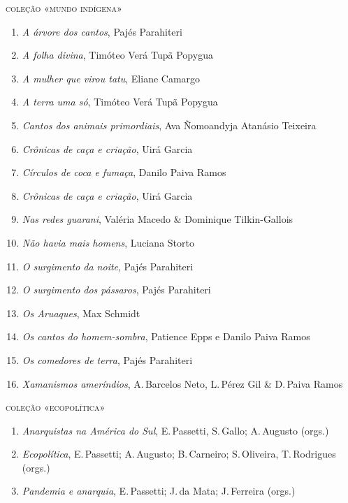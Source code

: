 \medskip
{\large\textsc{coleção «mundo indígena»}}

\begin{enumerate}
\setlength\parskip{4.2pt}
\setlength\itemsep{-1.4mm}
\item \textit{A árvore dos cantos}, Pajés Parahiteri
\item \textit{A folha divina}, Timóteo Verá Tupã Popygua
\item \textit{A mulher que virou tatu}, Eliane Camargo
\item \textit{A terra uma só}, Timóteo Verá Tupã Popygua
\item \textit{Cantos dos animais primordiais}, Ava Ñomoandyja Atanásio Teixeira
\item \textit{Crônicas de caça e criação}, Uirá Garcia
\item \textit{Círculos de coca e fumaça}, Danilo Paiva Ramos
\item \textit{Crônicas de caça e criação}, Uirá Garcia
\item \textit{Nas redes guarani}, Valéria Macedo \& Dominique Tilkin-Gallois
\item \textit{Não havia mais homens}, Luciana Storto
\item \textit{O surgimento da noite}, Pajés Parahiteri
\item \textit{O surgimento dos pássaros}, Pajés Parahiteri
\item \textit{Os Aruaques}, Max Schmidt
\item \textit{Os cantos do homem-sombra}, Patience Epps e Danilo Paiva Ramos
\item \textit{Os comedores de terra}, Pajés Parahiteri
\item \textit{Xamanismos ameríndios}, A.\,Barcelos Neto, L.\,Pérez Gil \& D.\,Paiva Ramos
\end{enumerate}

\medskip
{\large\textsc{coleção «ecopolítica»}}

\begin{enumerate}
\setlength\parskip{4.2pt}
\setlength\itemsep{-1.4mm}
\item \textit{Anarquistas na América do Sul}, E.\,Passetti, S.\,Gallo; A.\,Augusto  (orgs.)
\item \textit{Ecopolítica}, E.\,Passetti; A.\,Augusto; B.\,Carneiro; S.\,Oliveira, T.\,Rodrigues  (orgs.)
\item \textit{Pandemia e anarquia}, E.\,Passetti; J.\,da Mata; J.\,Ferreira  (orgs.)
\end{enumerate}

